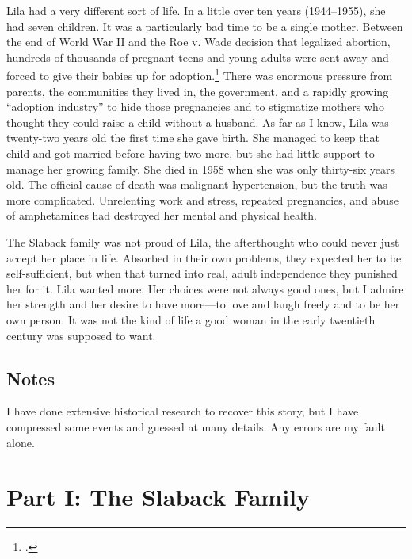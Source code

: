 \documentclass[
  american,
  letterpaper,
]{book}
\begin{document}
Lila had a very different sort of life. In a little over ten years
(1944--1955), she had seven children. It was a particularly bad time to
be a single mother. Between the end of World War II and the Roe v. Wade
decision that legalized abortion, hundreds of thousands of pregnant
teens and young adults were sent away and forced to give their babies up
for adoption.\footnote{.} There was enormous
pressure from parents, the communities they lived in, the government,
and a rapidly growing ``adoption industry'' to hide those pregnancies
and to stigmatize mothers who thought they could raise a child without a
husband. As far as I know, Lila was twenty-two years old the first time
she gave birth. She managed to keep that child and got married before
having two more, but she had little support to manage her growing
family. She died in 1958 when she was only thirty-six years old. The
official cause of death was malignant hypertension, but the truth was
more complicated. Unrelenting work and stress, repeated pregnancies, and
abuse of amphetamines had destroyed her mental and physical health.

The Slaback family was not proud of Lila, the afterthought who could
never just accept her place in life. Absorbed in their own problems,
they expected her to be self-sufficient, but when that turned into real,
adult independence they punished her for it. Lila wanted more. Her
choices were not always good ones, but I admire her strength and her
desire to have more---to love and laugh freely and to be her own person.
It was not the kind of life a good woman in the early twentieth century
was supposed to want.

\section{Notes}\label{notes}

I have done extensive historical research to recover this story, but I
have compressed some events and guessed at many details. Any errors are
my fault alone.


\chapter{Part I: The Slaback Family}\label{part-i-the-slaback-family}
\end{document}
